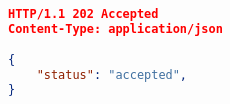 

\begin{lstlisting}[language=json,firstnumber=1]
HTTP/1.1 202 Accepted
Content-Type: application/json

{
    "status": "accepted",
}

\end{lstlisting}